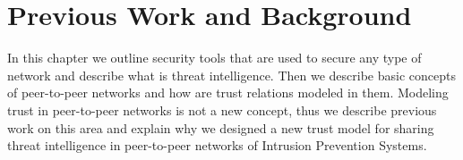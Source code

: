 \chapter{Previous Work and Background}
\label{ch:previous-work-background}
In this chapter we outline security tools that are used to secure any type of network and describe what is threat intelligence.
Then we describe basic concepts of peer-to-peer networks and how are trust relations modeled in them.
Modeling trust in peer-to-peer networks is not a new concept, thus we describe previous work on this area and explain why we designed a new trust model for sharing threat intelligence in peer-to-peer networks of Intrusion Prevention Systems.



